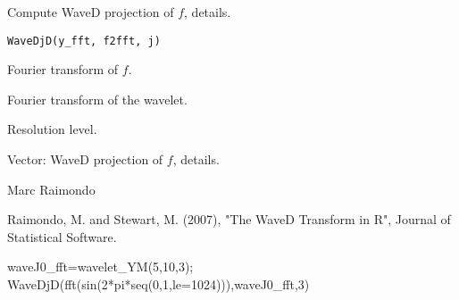 \documentclass{article}
\begin{document}
\begin{Description}\relax
Compute WaveD projection of $f$, details.
\end{Description}
\begin{Usage}
\begin{verbatim}
WaveDjD(y_fft, f2fft, j)
\end{verbatim}
\end{Usage}
\begin{Arguments}
\begin{ldescription}
\item[\code{y\_fft}] Fourier transform of $f$. 
\item[\code{f2fft}] Fourier transform of the wavelet.
\item[\code{j}] Resolution level. 
\end{ldescription}
\end{Arguments}
\begin{Value}
Vector:  WaveD projection of $f$, details.
\end{Value}
\begin{Author}\relax
Marc Raimondo
\end{Author}
\begin{References}\relax
Raimondo, M. and Stewart, M. (2007),
"The WaveD Transform in R", Journal of Statistical Software.
\end{References}
\begin{SeeAlso}\relax
{}
\end{SeeAlso}
\begin{Examples}
\begin{ExampleCode}

waveJ0_fft=wavelet_YM(5,10,3);
WaveDjD(fft(sin(2*pi*seq(0,1,le=1024))),waveJ0_fft,3)
\end{ExampleCode}
\end{Examples}
\end{document}
